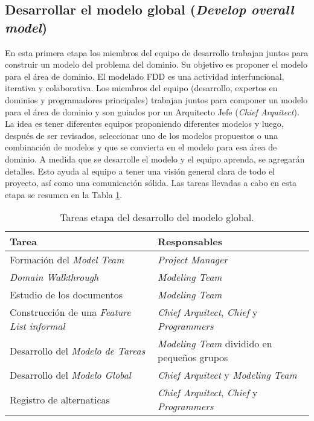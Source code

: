 \documentclass[11pt]{article}
\begin{document}
\subsection{Desarrollar el modelo global (\textit{Develop overall model})}
En esta primera etapa los miembros del equipo de desarrollo trabajan juntos para construir un modelo del problema del dominio. Su objetivo es proponer el modelo para el área de dominio. El modelado FDD es una actividad interfuncional, iterativa y colaborativa. Los miembros del equipo (desarrollo, expertos en dominios y programadores principales) trabajan juntos para componer un modelo para el área de dominio y son guiados por un Arquitecto Jefe (\textit{Chief Arquitect}). La idea es tener diferentes equipos proponiendo diferentes modelos y luego, después de ser revisados, seleccionar uno de los modelos propuestos o una combinación de modelos y que se convierta en el modelo para esa área de dominio. A medida que se desarrolle el modelo y el equipo aprenda, se agregarán detalles. Esto ayuda al equipo a tener una visión general clara de todo el proyecto, así como una comunicación sólida. Las tareas llevadas a cabo en esta etapa se resumen en la Tabla \ref{fig:DOM}. 

\begin{table}[H]
  \centering
\begin{tabular}{ |p{6cm}|p{6cm}|  }
	\hline
	Tarea & Responsables \\
	\hline
	Formación del
	\textit{Model Team}  &    \textit{Project
		Manager}\\
	
	\textit{Domain Walkthrough}  &    \textit{Modeling Team}\\
	
	Estudio de los documentos     &    \textit{Modeling Team}\\
	
	Construcción de una \textit{Feature List informal}  &    \textit{Chief Arquitect}, \textit{Chief} y \textit{Programmers}\\
	Desarrollo del \textit{Modelo de Tareas} & \textit{Modeling Team} dividido en pequeños grupos\\
	Desarrollo del \textit{Modelo Global}  &  \textit{Chief Arquitect} y \textit{Modeling Team}\\
	Registro de alternaticas    & \textit{Chief Arquitect}, \textit{Chief} y \textit{Programmers}\\
	\hline
\end{tabular}
\caption{Tareas etapa del desarrollo del modelo global.}\label{fig:DOM}
\end{table}
\end{document}
